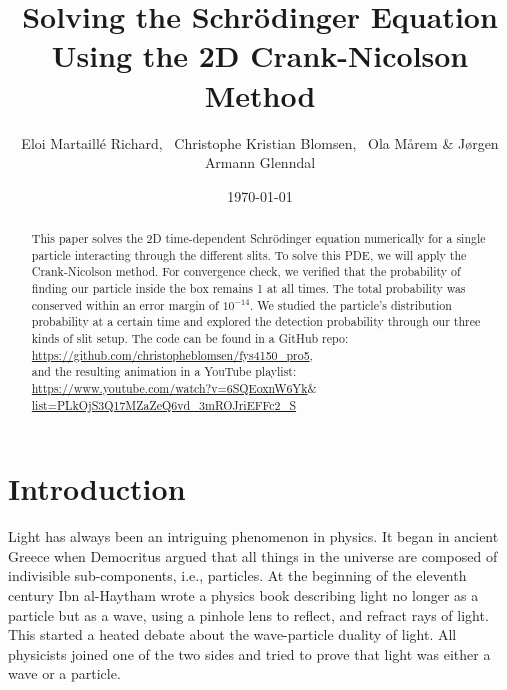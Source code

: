 \documentclass[english,notitlepage,reprint,nofootinbib]{revtex4-2}  %
\begin{document}
	
	\title{\Huge{Solving the Schrödinger Equation Using the 2D Crank-Nicolson Method}}  %
	\author{Eloi Martaillé Richard,
	\
	Christophe Kristian Blomsen,
	\
	Ola Mårem
	\&
	Jørgen Armann Glenndal
    }
	\date{\today}                             %
	\noaffiliation                            %
	
	\begin{abstract}
This paper solves the 2D time-dependent Schrödinger equation numerically for a single particle
	interacting through the different slits. To solve this PDE, we will apply the
	Crank-Nicolson method. For convergence check, we verified that the probability of finding our particle inside the box remains 1 at all times. The total probability was conserved within an
	error margin of  $10^{-14}$. We studied the particle's distribution probability at a certain time and explored the detection probability through our three kinds of slit setup.
	The code can be found in a GitHub repo:		\href{https://github.com/christopheblomsen/fys4150_pro5}{https://github.com/christopheblomsen/fys4150\_pro5}, 
	\\and the resulting animation in a YouTube playlist: \\
	\href{https://www.youtube.com/watch?v=6SQEoxnW6Yk&list=PLkOjS3Q17MZaZeQ6vd_3mROJriEFFc2_S }{https://www.youtube.com/watch?v=6SQEoxnW6Yk$\&$list=PLkOjS3Q17MZaZeQ6vd\_3mROJriEFFc2\_S}

\end{abstract}
	\maketitle	
	
	
	\section{Introduction} \label{sec:introduction}

	Light has always been an intriguing phenomenon in physics. It began in ancient Greece when Democritus argued that all things in the universe are composed of indivisible
	sub-components, i.e., particles. At the beginning of the eleventh century Ibn al-Haytham
	wrote a physics book describing light no longer as a particle but as a wave, using a
	pinhole lens to reflect, and refract rays of light. This started a heated debate about the
	wave-particle duality of light. All physicists joined one of the two sides and tried to
	prove that light was either a wave or a particle. \\
\end{document}

